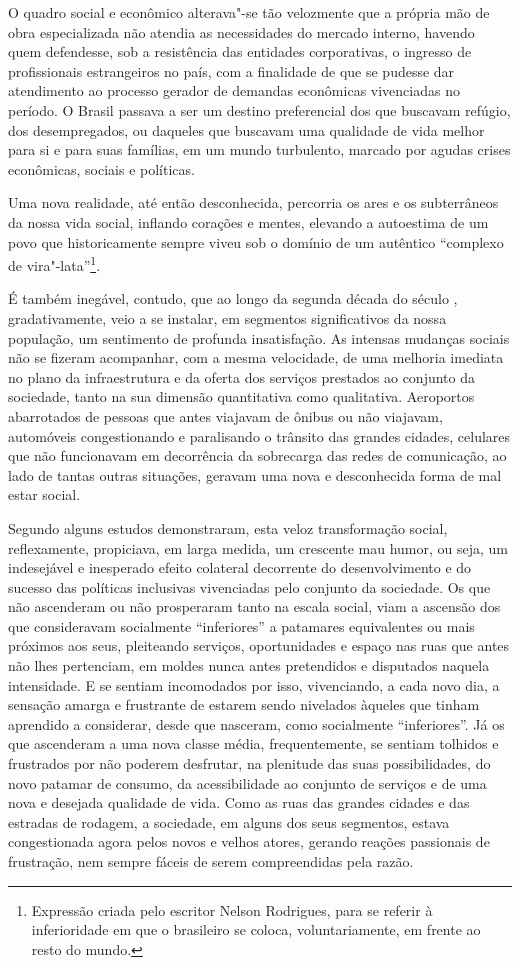 O quadro social e econômico alterava"-se tão velozmente que a própria mão
de obra especializada não atendia as necessidades do mercado interno,
havendo quem defendesse, sob a resistência das entidades corporativas, o
ingresso de profissionais estrangeiros no país, com a finalidade de que
se pudesse dar atendimento ao processo gerador de demandas econômicas
vivenciadas no período. O Brasil passava a ser um destino preferencial
dos que buscavam refúgio, dos desempregados, ou daqueles que buscavam
uma qualidade de vida melhor para si e para suas famílias, em um mundo
turbulento, marcado por agudas crises econômicas, sociais e políticas.

Uma nova realidade, até então desconhecida, percorria os ares e os
subterrâneos da nossa vida social, inflando corações e mentes, elevando
a autoestima de um povo que historicamente sempre viveu sob o domínio de
um autêntico ``complexo de vira"-lata''\footnote{Expressão criada
  pelo escritor Nelson Rodrigues, para se referir à inferioridade em que
  o brasileiro se coloca, voluntariamente, em frente ao resto do mundo.}.

É também inegável, contudo, que ao longo da segunda década do século
, gradativamente, veio a se instalar, em segmentos significativos da
nossa população, um sentimento de profunda insatisfação. As intensas
mudanças sociais não se fizeram acompanhar, com a mesma velocidade, de
uma melhoria imediata no plano da infraestrutura e da oferta dos
serviços prestados ao conjunto da sociedade, tanto na sua dimensão
quantitativa como qualitativa. Aeroportos abarrotados de pessoas que
antes viajavam de ônibus ou não viajavam, automóveis congestionando e
paralisando o trânsito das grandes cidades, celulares que não
funcionavam em decorrência da sobrecarga das redes de comunicação, ao
lado de tantas outras situações, geravam uma nova e desconhecida forma
de mal estar social.

Segundo alguns estudos demonstraram, esta veloz transformação social,
reflexamente, propiciava, em larga medida, um crescente mau humor, ou
seja, um indesejável e inesperado efeito colateral decorrente do
desenvolvimento e do sucesso das políticas inclusivas vivenciadas pelo
conjunto da sociedade. Os que não ascenderam ou não prosperaram tanto na
escala social, viam a ascensão dos que consideravam socialmente
``inferiores'' a patamares equivalentes ou mais próximos aos seus,
pleiteando serviços, oportunidades e espaço nas ruas que antes não lhes
pertenciam, em moldes nunca antes pretendidos e disputados naquela
intensidade. E se sentiam incomodados por isso, vivenciando, a cada novo
dia, a sensação amarga e frustrante de estarem sendo nivelados àqueles
que tinham aprendido a considerar, desde que nasceram, como socialmente
``inferiores''. Já os que ascenderam a uma nova classe média,
frequentemente, se sentiam tolhidos e frustrados por não poderem
desfrutar, na plenitude das suas possibilidades, do novo patamar de
consumo, da acessibilidade ao conjunto de serviços e de uma nova e
desejada qualidade de vida. Como as ruas das grandes cidades e das
estradas de rodagem, a sociedade, em alguns dos seus segmentos, estava
congestionada agora pelos novos e velhos atores, gerando reações
passionais de frustração, nem sempre fáceis de serem compreendidas pela
razão.

